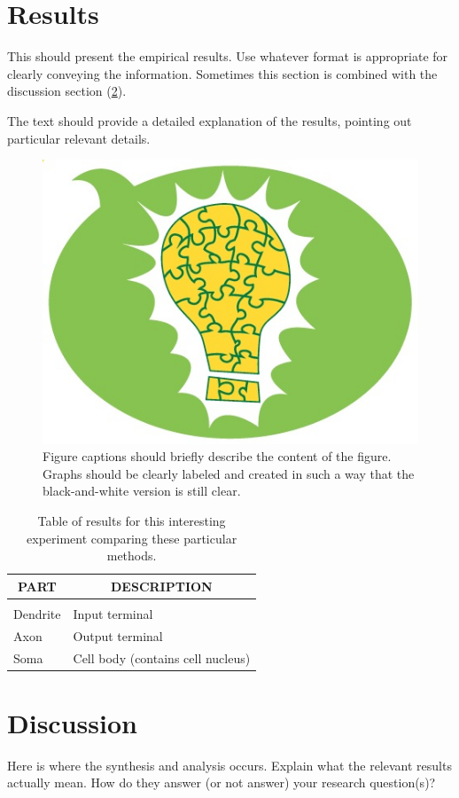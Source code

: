 \documentclass{article} %
\begin{document}
\section{Results}
\label{sec:results}
This should present the empirical results. Use whatever format is appropriate for clearly conveying the information. Sometimes this section is combined with the discussion section (\ref{sec:discussion}).

The text should provide a detailed explanation of the results, pointing out particular relevant details.

\begin{figure}[h]
\label{fig:myGraph}
\begin{center}
\includegraphics[width=.2\textwidth]{placeholder.jpg}
\end{center}
\caption{Figure captions should briefly describe the content of the figure. Graphs should be clearly labeled and created in such a way that the black-and-white version is still clear.}
\end{figure}

\begin{table}[t]
\label{tab:myTable}
\caption{Table of results for this interesting experiment comparing these particular methods.}
\begin{center}
\begin{tabular}{ll}
\multicolumn{1}{c}{\bf PART}  &\multicolumn{1}{c}{\bf DESCRIPTION}
\\ \hline \\
Dendrite         &Input terminal \\
Axon             &Output terminal \\
Soma             &Cell body (contains cell nucleus) \\
\end{tabular}
\end{center}
\end{table}

\section{Discussion}
\label{sec:discussion}
Here is where the synthesis and analysis occurs. Explain what the relevant results actually mean. How do they answer (or not answer) your research question(s)?
\end{document}
